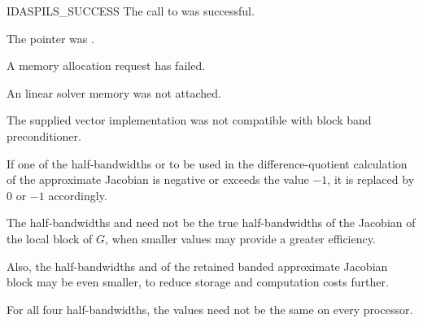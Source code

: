 {{  \begin{args}
  \item[IDASPILS\_SUCCESS]
    The call to  was successful.
  \item[\id{IDASPILS\_MEM\_NULL}] 
    The  pointer was .
  \item[\Id{IDASPILS\_MEM\_FAIL}]
    A memory allocation request has failed.
  \item[\Id{IDASPILS\_LMEM\_NULL}]
    An {\idaspils} linear solver memory was not attached.
  \item[\Id{IDASPILS\_ILL\_INPUT}]
    The supplied vector implementation was not compatible with block band preconditioner.
  \end{args}
}
{
  If one of the half-bandwidths  or  to be used in the 
  difference-quotient calculation of the approximate Jacobian is negative or 
  exceeds the value $-1$, it is replaced by 0 or $-1$
  accordingly.

  The half-bandwidths  and  need not be the true 
  half-bandwidths of the Jacobian of the local block of $G$,    
  when smaller values may provide a greater efficiency.       

  Also, the half-bandwidths  and  of the retained 
  banded approximate Jacobian block may be even smaller,      
  to reduce storage and computation costs further.            

  For all four half-bandwidths, the values need not be the    
  same on every processor.
}



}

